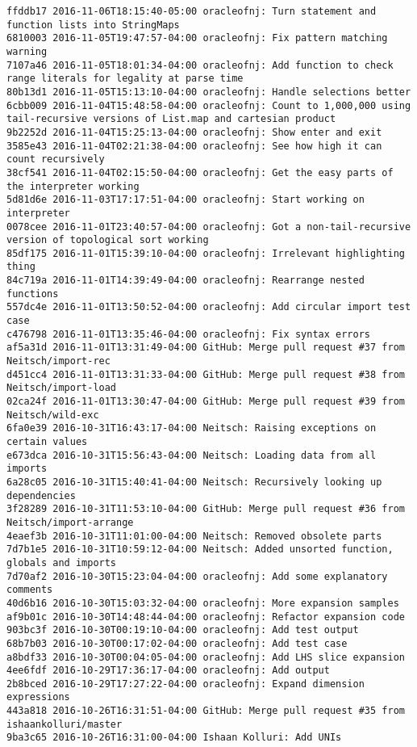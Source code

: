 \begin{lstlisting}
ffddb17 2016-11-06T18:15:40-05:00 oracleofnj: Turn statement and function lists into StringMaps
6810003 2016-11-05T19:47:57-04:00 oracleofnj: Fix pattern matching warning
7107a46 2016-11-05T18:01:34-04:00 oracleofnj: Add function to check range literals for legality at parse time
80b13d1 2016-11-05T15:13:10-04:00 oracleofnj: Handle selections better
6cbb009 2016-11-04T15:48:58-04:00 oracleofnj: Count to 1,000,000 using tail-recursive versions of List.map and cartesian product
9b2252d 2016-11-04T15:25:13-04:00 oracleofnj: Show enter and exit
3585e43 2016-11-04T02:21:38-04:00 oracleofnj: See how high it can count recursively
38cf541 2016-11-04T02:15:50-04:00 oracleofnj: Get the easy parts of the interpreter working
5d81d6e 2016-11-03T17:17:51-04:00 oracleofnj: Start working on interpreter
0078cee 2016-11-01T23:40:57-04:00 oracleofnj: Got a non-tail-recursive version of topological sort working
85df175 2016-11-01T15:39:10-04:00 oracleofnj: Irrelevant highlighting thing
84c719a 2016-11-01T14:39:49-04:00 oracleofnj: Rearrange nested functions
557dc4e 2016-11-01T13:50:52-04:00 oracleofnj: Add circular import test case
c476798 2016-11-01T13:35:46-04:00 oracleofnj: Fix syntax errors
af5a31d 2016-11-01T13:31:49-04:00 GitHub: Merge pull request #37 from Neitsch/import-rec
d451cc4 2016-11-01T13:31:33-04:00 GitHub: Merge pull request #38 from Neitsch/import-load
02ca24f 2016-11-01T13:30:47-04:00 GitHub: Merge pull request #39 from Neitsch/wild-exc
6fa0e39 2016-10-31T16:43:17-04:00 Neitsch: Raising exceptions on certain values
e673dca 2016-10-31T15:56:43-04:00 Neitsch: Loading data from all imports
6a28c05 2016-10-31T15:40:41-04:00 Neitsch: Recursively looking up dependencies
3f28289 2016-10-31T11:53:10-04:00 GitHub: Merge pull request #36 from Neitsch/import-arrange
4eaef3b 2016-10-31T11:01:00-04:00 Neitsch: Removed obsolete parts
7d7b1e5 2016-10-31T10:59:12-04:00 Neitsch: Added unsorted function, globals and imports
7d70af2 2016-10-30T15:23:04-04:00 oracleofnj: Add some explanatory comments
40d6b16 2016-10-30T15:03:32-04:00 oracleofnj: More expansion samples
af9b01c 2016-10-30T14:48:44-04:00 oracleofnj: Refactor expansion code
903bc3f 2016-10-30T00:19:10-04:00 oracleofnj: Add test output
68b7b03 2016-10-30T00:17:02-04:00 oracleofnj: Add test case
a8bdf33 2016-10-30T00:04:05-04:00 oracleofnj: Add LHS slice expansion
4ee6fdf 2016-10-29T17:36:17-04:00 oracleofnj: Add output
2b8bced 2016-10-29T17:27:22-04:00 oracleofnj: Expand dimension expressions
443a818 2016-10-26T16:31:51-04:00 GitHub: Merge pull request #35 from ishaankolluri/master
9ba3c65 2016-10-26T16:31:00-04:00 Ishaan Kolluri: Add UNIs

\end{lstlisting}
